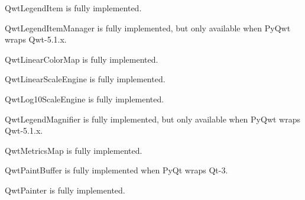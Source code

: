 \documentclass[a4paper,10pt,english]{manual}
\begin{document}
\hypertarget{PyQt4.Qwt5.QwtLegendItem}{}\begin{classdesc}{QwtLegendItem}{}
is fully implemented.
\end{classdesc}

\hypertarget{PyQt4.Qwt5.QwtLegendItemManager}{}\begin{classdesc}{QwtLegendItemManager}{}
is fully implemented, but only available when PyQwt wraps Qwt-5.1.x.
\end{classdesc}

\hypertarget{PyQt4.Qwt5.QwtLinearColorMap}{}\begin{classdesc}{QwtLinearColorMap}{}
is fully implemented.
\end{classdesc}

\hypertarget{PyQt4.Qwt5.QwtLinearScaleEngine}{}\begin{classdesc}{QwtLinearScaleEngine}{}
is fully implemented.
\end{classdesc}

\hypertarget{PyQt4.Qwt5.QwtLog10ScaleEngine}{}\begin{classdesc}{QwtLog10ScaleEngine}{}
is fully implemented.
\end{classdesc}

\hypertarget{PyQt4.Qwt5.QwtLegendMagnifier}{}\begin{classdesc}{QwtLegendMagnifier}{}
is fully implemented, but only available when PyQwt wraps Qwt-5.1.x.
\end{classdesc}

\hypertarget{PyQt4.Qwt5.QwtMetricsMap}{}\begin{classdesc}{QwtMetricsMap}{}
is fully implemented.
\end{classdesc}

\hypertarget{PyQt4.Qwt5.QwtPaintBuffer}{}\begin{classdesc}{QwtPaintBuffer}{}
is fully implemented when PyQt wraps Qt-3.
\end{classdesc}

\hypertarget{PyQt4.Qwt5.QwtPainter}{}\begin{classdesc}{QwtPainter}{}
is fully implemented.
\end{classdesc}
\end{document}
